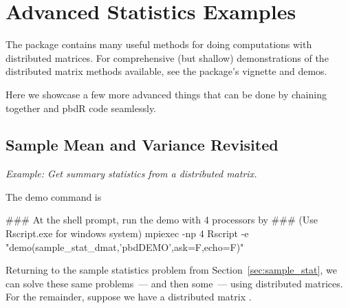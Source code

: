 
\chapter{Advanced Statistics Examples}\label{chpt:avdstat}

The  package contains many useful methods for doing computations with distributed matrices.  For comprehensive (but shallow) demonstrations of the distributed matrix methods available, see the  package's vignette and demos.

Here we showcase a few more advanced things that can be done by chaining together  and pbdR code seamlessly.





\section{Sample Mean and Variance Revisited}

\emph{Example:  Get summary statistics from a distributed matrix.}

The demo command is
\begin{Command}
### At the shell prompt, run the demo with 4 processors by
### (Use Rscript.exe for windows system)
mpiexec -np 4 Rscript -e "demo(sample_stat_dmat,'pbdDEMO',ask=F,echo=F)"
\end{Command}

Returning to the sample statistics problem from Section~\ref{sec:sample_stat}, we can solve these same problems~--- and then some~--- using distributed matrices.  For the remainder, suppose we have a distributed matrix .

